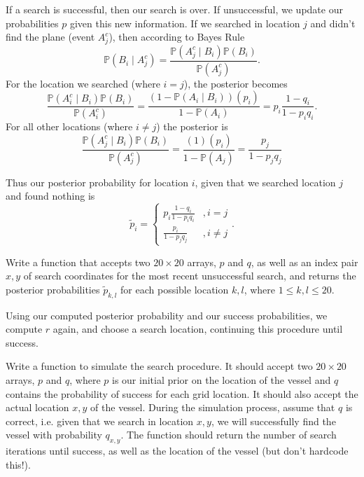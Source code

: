 If a search is successful, then our search is over. If unsuccessful, we update our probabilities $p$ given this new information. If we searched in location $j$ and didn't find the plane (event  $A_j^c$), then according to Bayes Rule 
\begin{equation*}
\mathbb{P}(B_{i} \; | \; A_j^c) 
= \frac{\mathbb{P}(A_j^c \; | \; B_{i})\mathbb{P}(B_{i})}{\mathbb{P}(A_j^c)}.
\end{equation*}
For the location we searched (where $i=j$), the posterior becomes 
\begin{equation*}
\frac{\mathbb{P}(A_i^c \; | \; B_{i})\mathbb{P}(B_{i})}{\mathbb{P}(A_i^c)} 
= \frac{(1-\mathbb{P}(A_i \; | \; B_{i}))(p_i)}{1-\mathbb{P}(A_i)}  = p_{i}\frac{1-q_{i}}{1-p_{i}q_{i}}. 
\end{equation*}
 For all other locations (where $i \neq j$) the posterior is $$\frac{\mathbb{P}(A_j^c \; | \; B_{i})\mathbb{P}(B_{i})}{\mathbb{P}(A_j^c)} =\frac{(1)(p_i)}{1-\mathbb{P}(A_j)} = \frac{p_j}{1-p_j q_j}$$


Thus our posterior probability for location $i$, given that we searched location $j$ and found nothing is
$$\tilde{p}_{i} = \begin{cases} 
 p_{i}\frac{1-q_{i}}{1-p_{i}q_{i}} & ,  i=j \\
\frac{p_{i}}{1-p_{j}q_{j}} & , i \neq j 
\end{cases}.$$

\begin{problem}
Write a function that accepts two $20 \times 20$ arrays, $p$ and $q$, as well as an index pair $x,y$ of search coordinates for the most recent unsuccessful search, and returns the posterior probabilities $\tilde{p}_{k,l}$ for each possible location $k,l$, where $1 \leq k,l \leq 20$.
\end{problem}

Using our computed posterior probability and our success probabilities, we compute $r$ again, and choose a search location, continuing this procedure until success.

\begin{problem}
Write a function to simulate the search procedure. It should accept two $20 \times 20$ arrays, $p$ and $q$, where $p$ is our initial prior on the location of the vessel and $q$ contains the probability of success for each grid location. It should also accept the actual location $x,y$ of the vessel. During the simulation process, assume that $q$ is correct, i.e. given that we search in location $x,y$, we will successfully find the vessel with probability $q_{x,y}$. The function should return the number of search iterations until success, as well as the location of the vessel (but don't hardcode this!).
\end{problem}

